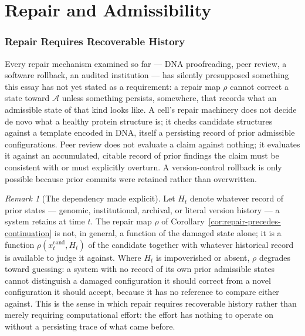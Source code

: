 \documentclass[11pt,a4paper]{article}
\theoremstyle{plain}
\theoremstyle{definition}
\theoremstyle{remark}
\newtheorem{remark}[theorem]{Remark}
\newcommand{\Adm}{\mathcal{A}}
\begin{document}
\part{Repair and Admissibility}

\section{Repair Requires Recoverable History}
\label{sec:repair-requires-history}

Every repair mechanism examined so far — DNA proofreading, peer review, a software rollback, an audited institution — has silently presupposed something this essay has not yet stated as a requirement: a repair map $\rho$ cannot correct a state toward $\Adm$ unless something persists, somewhere, that records what an admissible state of that kind looks like. A cell's repair machinery does not decide de novo what a healthy protein structure is; it checks candidate structures against a template encoded in DNA, itself a persisting record of prior admissible configurations. Peer review does not evaluate a claim against nothing; it evaluates it against an accumulated, citable record of prior findings the claim must be consistent with or must explicitly overturn. A version-control rollback is only possible because prior commits were retained rather than overwritten.

\begin{remark}[The dependency made explicit]
\label{rem:repair-needs-history}
Let $H_t$ denote whatever record of prior states — genomic, institutional, archival, or literal version history — a system retains at time $t$. The repair map $\rho$ of Corollary~\ref{cor:repair-precedes-continuation} is not, in general, a function of the damaged state alone; it is a function $\rho(x_t^{\mathrm{cand}}, H_t)$ of the candidate together with whatever historical record is available to judge it against. Where $H_t$ is impoverished or absent, $\rho$ degrades toward guessing: a system with no record of its own prior admissible states cannot distinguish a damaged configuration it should correct from a novel configuration it should accept, because it has no reference to compare either against. This is the sense in which repair requires recoverable history rather than merely requiring computational effort: the effort has nothing to operate on without a persisting trace of what came before.
\end{remark}
\end{document}

